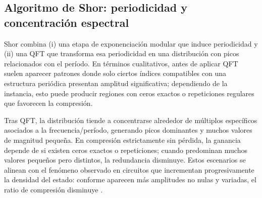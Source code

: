 \subsection{Algoritmo de Shor: periodicidad y concentración espectral}
\label{subsec:patrones_shor}

Shor combina (i) una etapa de exponenciación modular que induce periodicidad y (ii) una QFT que transforma esa periodicidad en una distribución con picos relacionados con el período. En términos cualitativos, antes de aplicar QFT suelen aparecer patrones donde solo ciertos índices compatibles con una estructura periódica presentan amplitud significativa; dependiendo de la instancia, esto puede producir regiones con ceros exactos o repeticiones regulares que favorecen la compresión.

Tras QFT, la distribución tiende a concentrarse alrededor de múltiplos específicos asociados a la frecuencia/período, generando picos dominantes y muchos valores de magnitud pequeña. En compresión estrictamente sin pérdida, la ganancia depende de si existen ceros exactos o repeticiones; cuando predominan muchos valores pequeños pero distintos, la redundancia disminuye. Estos escenarios se alinean con el fenómeno observado en circuitos que incrementan progresivamente la densidad del estado: conforme aparecen más amplitudes no nulas y variadas, el ratio de compresión disminuye \cite{wu2018amplitude}.
